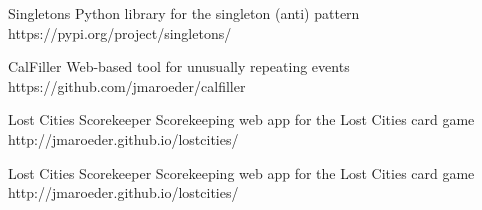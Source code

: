 



\begin{cvhonors}


\cvhonor
{Singletons} %
{Python library for the singleton (anti) pattern} %
{https://pypi.org/project/singletons/} %


\cvhonor
{CalFiller} %
{Web-based tool for unusually repeating events} %
{https://github.com/jmaroeder/calfiller} %


\cvhonor
{Lost Cities Scorekeeper} %
{Scorekeeping web app for the Lost Cities card game} %
{http://jmaroeder.github.io/lostcities/} %


\cvhonor
{Lost Cities Scorekeeper} %
{Scorekeeping web app for the Lost Cities card game} %
{http://jmaroeder.github.io/lostcities/} %


\end{cvhonors}



